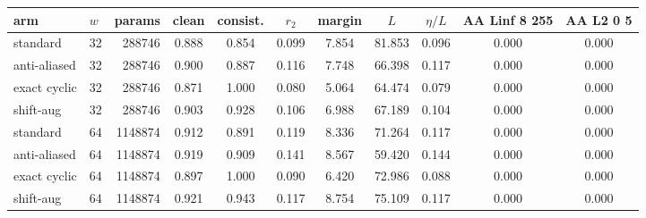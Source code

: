 \begin{tabular}{ll r ccc ccc cc}
\toprule
arm & $w$ & params & clean & consist. & $r_2$ & margin & $L$ & $\eta/L$ & AA Linf 8 255 & AA L2 0 5 \\
\midrule
standard & 32 & 288746 & 0.888 & 0.854 & 0.099 & 7.854 & 81.853 & 0.096 & 0.000 & 0.000 \\
anti-aliased & 32 & 288746 & 0.900 & 0.887 & 0.116 & 7.748 & 66.398 & 0.117 & 0.000 & 0.000 \\
exact cyclic & 32 & 288746 & 0.871 & 1.000 & 0.080 & 5.064 & 64.474 & 0.079 & 0.000 & 0.000 \\
shift-aug & 32 & 288746 & 0.903 & 0.928 & 0.106 & 6.988 & 67.189 & 0.104 & 0.000 & 0.000 \\
\midrule
standard & 64 & 1148874 & 0.912 & 0.891 & 0.119 & 8.336 & 71.264 & 0.117 & 0.000 & 0.000 \\
anti-aliased & 64 & 1148874 & 0.919 & 0.909 & 0.141 & 8.567 & 59.420 & 0.144 & 0.000 & 0.000 \\
exact cyclic & 64 & 1148874 & 0.897 & 1.000 & 0.090 & 6.420 & 72.986 & 0.088 & 0.000 & 0.000 \\
shift-aug & 64 & 1148874 & 0.921 & 0.943 & 0.117 & 8.754 & 75.109 & 0.117 & 0.000 & 0.000 \\
\bottomrule
\end{tabular}